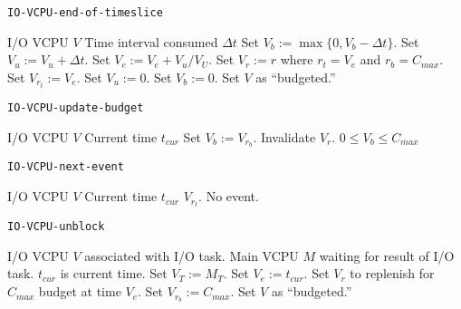 \documentclass[twocolumn,10pt]{article}
\begin{document}
\begin{algorithm}[!htb]
  \caption{\tt IO-VCPU-end-of-timeslice}\label{alg:iovcpu_eot}
  \begin{algorithmic}[1]\algorithmsize
    \REQUIRE I/O VCPU $V$
    \REQUIRE Time interval consumed $\Delta t$
    \STATE Set $V_b:=\max\{0,V_b-\Delta t\}$.
    \STATE Set $V_u:=V_u+\Delta t$.
    \STATE Set $V_e:=V_e+V_u/V_U$.
    \STATE Set $V_r:=r$ where $r_t=V_e$ and $r_b=C_{max}$.
    \ELSE
    \STATE Set $V_{r_t}:=V_e$.
    \ENDIF
    \STATE Set $V_u:=0$.
    \STATE Set $V_b:=0$.
    \STATE Set $V$ as \NOT ``budgeted.''
    \ENDIF
    \ENDIF
  \end{algorithmic}
\end{algorithm}

\begin{algorithm}[!htb]
  \caption{\tt IO-VCPU-update-budget}\label{alg:iovcpu_upbudg}
  \begin{algorithmic}[1]\algorithmsize
    \REQUIRE I/O VCPU $V$
    \REQUIRE Current time $t_{cur}$
    \STATE Set $V_b:=V_{r_b}$.
    \STATE Invalidate $V_r$.
    \ENDIF
    \ENSURE $0\leq V_b\leq C_{max}$
  \end{algorithmic}
\end{algorithm}

\begin{algorithm}[!htb]
  \caption{\tt IO-VCPU-next-event}\label{alg:iovcpu_nextevent}
  \begin{algorithmic}[1]\algorithmsize
    \REQUIRE I/O VCPU $V$
    \REQUIRE Current time $t_{cur}$
    \RETURN $V_{r_t}$.
    \ELSE
    \RETURN No event.
    \ENDIF
  \end{algorithmic}
\end{algorithm}

\begin{algorithm}[!htb]
  \caption{\tt IO-VCPU-unblock}\label{alg:iovcpu_unblock}
  \begin{algorithmic}[1]\algorithmsize
    \REQUIRE I/O VCPU $V$ associated with I/O task.
    \REQUIRE Main VCPU $M$ waiting for result of I/O task.
    \REQUIRE $t_{cur}$ is current time.
    \STATE Set $V_T:=M_T$.
    \ENDIF
    \STATE Set $V_e:=t_{cur}$.
    \ENDIF
    \STATE Set $V_r$ to replenish for $C_{max}$ budget at time $V_e$.
    \ENDIF
    \ELSE
    \STATE Set $V_{r_b}:=C_{max}$.
    \ENDIF
    \STATE Set $V$ as ``budgeted.''
  \end{algorithmic}
\end{algorithm}
\end{document}
